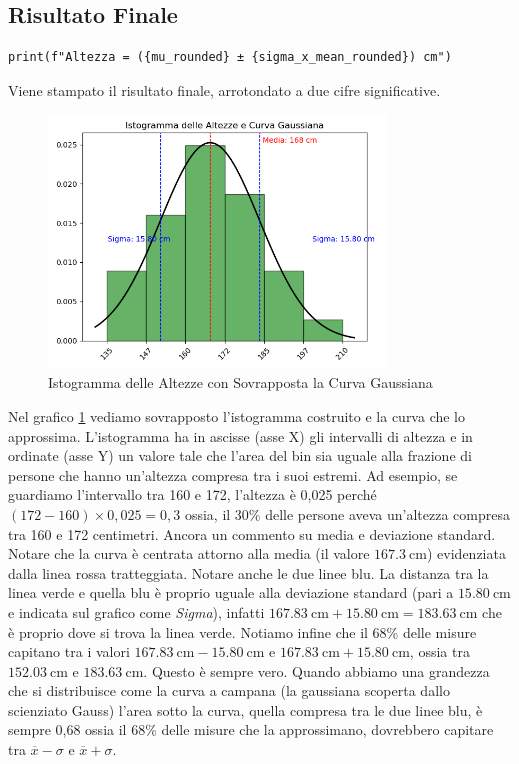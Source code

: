 \documentclass[a4paper,12pt]{article}
\begin{document}
\subsection{Risultato Finale}
\begin{lstlisting}
print(f"Altezza = ({mu_rounded} ± {sigma_x_mean_rounded}) cm")
\end{lstlisting}
Viene stampato il risultato finale, arrotondato a due cifre significative.
\begin{figure}[h!]
    \centering
    \includegraphics[width=0.8\textwidth]{istogramma.png}
    \caption{Istogramma delle Altezze con Sovrapposta la Curva Gaussiana}
    \label{fig:istogramma}
\end{figure}
Nel grafico \ref{fig:istogramma} vediamo sovrapposto l'istogramma costruito e la curva che lo approssima. L'istogramma ha in ascisse (asse X) gli intervalli di altezza e in ordinate (asse Y) un valore tale che l'area del bin sia uguale alla frazione di persone che hanno un'altezza compresa tra i suoi estremi. Ad esempio, se guardiamo l'intervallo tra 160 e 172, l'altezza è 0,025 perché $\left(172-160 \right)\times 0,025 =0,3$ ossia, il 30\% delle persone aveva un'altezza compresa tra 160 e 172 centimetri. Ancora un commento su media e deviazione standard. Notare che la curva è centrata attorno alla media (il valore $\SI{167,3}{\centi\meter}$) evidenziata dalla linea rossa tratteggiata. Notare anche le due linee blu. La distanza tra la linea verde e quella blu è proprio uguale alla deviazione standard (pari a $\SI{15,80}{\centi\meter}$ e indicata sul grafico come \textit{Sigma}), infatti $\SI{167,83}{\centi\meter} + \SI{15,80}{\centi\meter} = \SI{183,63}{\centi\meter}$ che è proprio dove si trova la linea verde. Notiamo infine che il 68\% delle misure capitano tra i valori $\SI{167,83}{\centi\meter} -\SI{15,80}{\centi\meter}$ e $\SI{167,83}{\centi\meter} +\SI{15,80}{\centi\meter}$, ossia tra $\SI{152,03}{\centi\meter}$ e $\SI{183,63}{\centi\meter}$. Questo è sempre vero. Quando abbiamo una grandezza che si distribuisce come la curva a campana (la gaussiana scoperta dallo scienziato Gauss) l'area sotto la curva, quella compresa tra le due linee blu, è sempre 0,68 ossia il 68\% delle misure che la approssimano, dovrebbero capitare tra $\overline{x} -\sigma$ e $\overline{x} + \sigma$.
\end{document}
